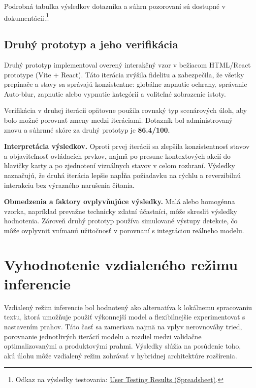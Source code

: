 Podrobná tabuľka výsledkov dotazníka a súhrn pozorovaní sú dostupné v dokumentácii.\footnote{Odkaz na výsledky testovania: \href{https://docs.google.com/spreadsheets/d/1EyIOnNBmjI6_5DjKKHNp1mlViQyInPSu9pmalV57u8U/edit?usp=sharing}{User Testing Results (Spreadsheet)}.}

\subsection{Druhý prototyp a jeho verifikácia}
Druhý prototyp implementoval overený interakčný vzor v bežiacom HTML/React prototype (Vite + React). Táto iterácia zvýšila fidelitu a zabezpečila, že všetky prepínače a stavy sa správajú konzistentne: globálne zapnutie ochrany, správanie Auto-blur, zapnutie alebo vypnutie kategórií a voliteľné zobrazenie istoty.

Verifikácia v druhej iterácii opätovne použila rovnaký typ scenárových úloh, aby bolo možné porovnať zmeny medzi iteráciami. Dotazník bol administrovaný znovu a súhrnné skóre za druhý prototyp je \textbf{86.4/100}.

\textbf{Interpretácia výsledkov.} Oproti prvej iterácii sa zlepšila konzistentnosť stavov a objaviteľnosť ovládacích prvkov, najmä po presune kontextových akcií do hlavičky karty a po zjednotení vizuálnych stavov v celom rozhraní. Výsledky naznačujú, že druhá iterácia lepšie napĺňa požiadavku na rýchlu a reverzibilnú interakciu bez výrazného narušenia čítania.

\textbf{Obmedzenia a faktory ovplyvňujúce výsledky.} Malá alebo homogénna vzorka, napríklad prevažne technicky zdatní účastníci, môže skresliť výsledky hodnotenia. Zároveň druhý prototyp používa simulované výstupy detekcie, čo môže ovplyvniť vnímanú užitočnosť v porovnaní s integráciou reálneho modelu.

\section{Vyhodnotenie vzdialeného režimu inferencie}

Vzdialený režim inferencie bol hodnotený ako alternatíva k lokálnemu spracovaniu textu, ktorá umožňuje použiť výkonnejší model a flexibilnejšie experimentovať s nastavením prahov. Táto časť sa zameriava najmä na vplyv nerovnováhy tried, porovnanie jednotlivých iterácií modelu a rozdiel medzi validačne optimalizovanými a produktovými prahmi. Výsledky slúžia na posúdenie toho, akú úlohu môže vzdialený režim zohrávať v hybridnej architektúre rozšírenia.

